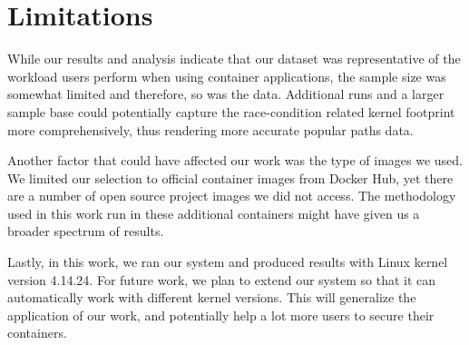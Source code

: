 \section{Limitations}
\label{sec.limitation}
While our results and analysis indicate that our dataset was representative of the workload users perform when using container applications, 
the sample size was somewhat limited and therefore, so was the data. 
Additional runs and a larger sample base could potentially capture the race-condition related kernel footprint more comprehensively, thus rendering more accurate popular paths data. 

Another factor that could have affected our work was the type of images we used. 
We limited our selection to official container images from Docker Hub, yet there are a number of open source project images we did not access. 
The methodology used in this work run in these additional containers might have given us a broader spectrum of results.

Lastly, in this work, we ran our system and produced results with Linux kernel version 4.14.24. 
For future work, we plan to extend our system so that it can automatically work with different kernel versions. 
This will generalize the application of our work, and potentially help a lot more users to secure their containers.